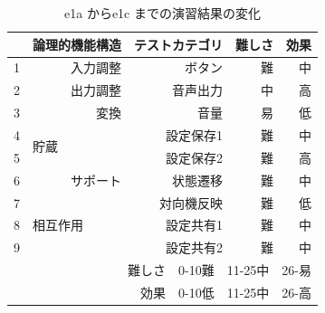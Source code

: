 \begin{table}[htbp]
  \centering
  \caption{e1a からe1c までの演習結果の変化}
    \begin{tabular}{rrrrr}
    \hline
    \multicolumn{1}{|l|}{} & \multicolumn{1}{p{7em}|}{論理的機能構造} & \multicolumn{1}{p{7em}|}{テストカテゴリ} & \multicolumn{1}{p{4.5em}|}{難しさ} & \multicolumn{1}{p{4.5em}|}{効果} \bigstrut\\
    \hline
    \hline
    \multicolumn{1}{|l|}{1} & \multicolumn{1}{p{6em}|}{入力調整} & \multicolumn{1}{p{6em}|}{ボタン} & \multicolumn{1}{p{6em}|}{難} & \multicolumn{1}{p{6em}|}{中} \bigstrut\\
    \hline
    \multicolumn{1}{|l|}{2} & \multicolumn{1}{p{6em}|}{出力調整} & \multicolumn{1}{p{6em}|}{音声出力} & \multicolumn{1}{p{6em}|}{中} & \multicolumn{1}{p{6em}|}{高} \bigstrut\\
    \hline
    \multicolumn{1}{|l|}{3} & \multicolumn{1}{p{6em}|}{変換} & \multicolumn{1}{p{6em}|}{音量} & \multicolumn{1}{p{6em}|}{易} & \multicolumn{1}{p{6em}|}{低} \bigstrut\\
    \hline
    \multicolumn{1}{|l|}{4} & \multicolumn{1}{l|}{\multirow{2}[4]{*}{貯蔵}} & \multicolumn{1}{p{6em}|}{設定保存1} & \multicolumn{1}{p{6em}|}{難} & \multicolumn{1}{p{6em}|}{中} \bigstrut\\
\cline{1-1}\cline{3-5}    \multicolumn{1}{|l|}{5} & \multicolumn{1}{l|}{} & \multicolumn{1}{p{6em}|}{設定保存2} & \multicolumn{1}{p{6em}|}{難} & \multicolumn{1}{p{6em}|}{高} \bigstrut\\
    \hline
    \multicolumn{1}{|l|}{6} & \multicolumn{1}{p{6em}|}{サポート} & \multicolumn{1}{p{6em}|}{状態遷移} & \multicolumn{1}{p{6em}|}{難} & \multicolumn{1}{p{6em}|}{中} \bigstrut\\
    \hline
    \multicolumn{1}{|r|}{7} & \multicolumn{1}{l|}{\multirow{3}[6]{*}{相互作用}} & \multicolumn{1}{p{6em}|}{対向機反映} & \multicolumn{1}{p{6em}|}{難} & \multicolumn{1}{p{6em}|}{低} \bigstrut\\
\cline{1-1}\cline{3-5}    \multicolumn{1}{|r|}{8} & \multicolumn{1}{l|}{} & \multicolumn{1}{p{6em}|}{設定共有1} & \multicolumn{1}{p{6em}|}{難} & \multicolumn{1}{p{6em}|}{中} \bigstrut\\
\cline{1-1}\cline{3-5}    \multicolumn{1}{|r|}{9} & \multicolumn{1}{l|}{} & \multicolumn{1}{p{6em}|}{設定共有2} & \multicolumn{1}{p{6em}|}{難} & \multicolumn{1}{p{6em}|}{中} \bigstrut\\
    \hline
    \multicolumn{5}{p{30em}}{難しさ　0-10難　11-25中　26-易} \bigstrut[t]\\
    \multicolumn{5}{p{30em}}{効果　0-10低　11-25中　26-高} \bigstrut[t] \\
    \end{tabular}%
  \label{tab:D-3-tab10}%
\end{table}%

